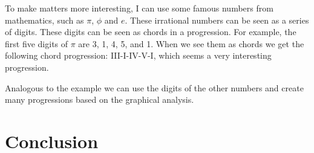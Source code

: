 \documentclass[12pt]{article}
\begin{document}
To make matters more interesting, I can use some famous numbers from mathematics, such as $\pi$, $\phi$ and $e$. These irrational numbers can be seen as a series of digits. These digits can be seen as chords in a progression. For example, the first five digits of $\pi$ are 3, 1, 4, 5, and 1. When we see them as chords we get the following chord progression: III-I-IV-V-I, which seems a very interesting progression.
\newline

Analogous to the example we can use the digits of the other numbers and create many progressions based on the graphical analysis.

\section{Conclusion}
\end{document}

